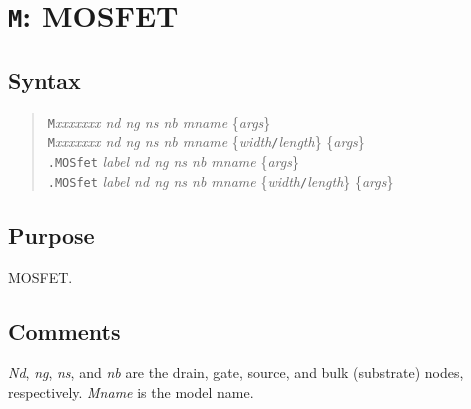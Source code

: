 %
%
%
%
\section{{\tt M}: MOSFET}
\subsection{Syntax}
\begin{verse}
{\tt M}{\it xxxxxxx nd ng ns nb mname} \{{\it args}\}\\
{\tt M}{\it xxxxxxx nd ng ns nb mname}
	\{{\it width}{\tt /}{\it length}\} \{{\it args}\}\\
{\tt .MOSfet} {\it label nd ng ns nb mname} \{{\it args}\}\\
{\tt .MOSfet} {\it label nd ng ns nb mname}
	\{{\it width}{\tt /}{\it length}\} \{{\it args}\}
\end{verse}
\subsection{Purpose}

MOSFET.
\subsection{Comments}

{\it Nd}, {\it ng}, {\it ns}, and {\it nb} are the drain, gate, source, and
bulk (substrate) nodes, respectively.  {\it Mname} is the model name.

